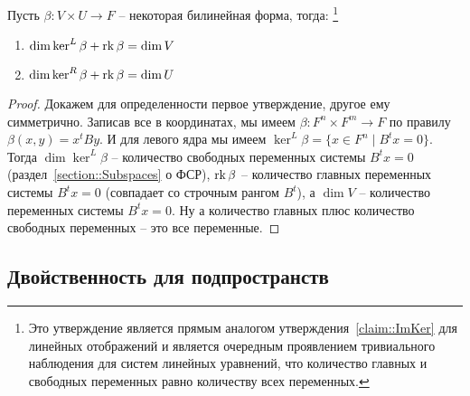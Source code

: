 \begin{claim}
\label{claim::BilinearKernels}
Пусть $\beta\colon V\times U\to F$ -- некоторая билинейная форма, тогда:%
\footnote{Это утверждение является прямым аналогом утверждения~\ref{claim::ImKer} для линейных отображений и является очередным проявлением тривиального наблюдения для систем линейных уравнений, что количество главных и свободных переменных равно количеству всех переменных.}
\begin{enumerate}
\item $\dim\ker^L \beta + \operatorname{rk} \beta = \dim V$

\item $\dim\ker^R \beta + \operatorname{rk} \beta = \dim U$
\end{enumerate}
\end{claim}
\begin{proof}
Докажем для определенности первое утверждение, другое ему симметрично.
Записав все в координатах, мы имеем $\beta \colon F^n \times F^m \to F$ по правилу $\beta(x,y) = x^t By$.
И для левого ядра мы имеем $\ker^L \beta = \{x\in F^n \mid B^t x = 0\}$.
Тогда $\dim \ker^L\beta$ -- количество свободных переменных системы $B^t x=0$ (раздел~\ref{section::Subspaces} о ФСР), $\operatorname{rk} \beta$ -- количество главных переменных системы $B^t x = 0$ (совпадает со строчным рангом $B^t$), а $\dim V $ -- количество переменных системы $B^t x = 0$.
Ну а количество главных плюс количество свободных переменных -- это все переменные.
\end{proof}

\subsection{Двойственность для подпространств}

